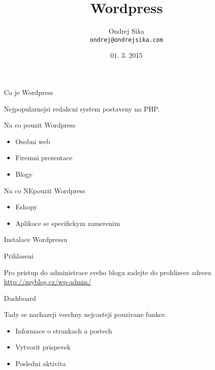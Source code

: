 \documentclass{beamer}
\title
    [Wordpress]
    {Wordpress}
\author
    [Ondrej Sika]
    {Ondrej Sika\\\texttt{ondrej@ondrejsika.com}}
\institute
    [Czechitas]
    {Czechitas\\\url{www.czechitas.cz}}
\date
    {01. 3. 2015}
\begin{document}
\maketitle

\begin{frame}
    {Co je Wordpress}

    Nejpopularnejsi redakcni system postaveny na PHP.
\end{frame}


\begin{frame}
    {Na co pouzit Wordpress}

    \begin{itemize}
        \item Osobni web
        \item Firemni prezentace
        \item Blogy
    \end{itemize}
\end{frame}


\begin{frame}
    {Na co NEpouzit Wordpress}

    \begin{itemize}
        \item Eshopy
        \item Aplikace se specifickym zamerenim
    \end{itemize}
\end{frame}


\begin{frame}
    {Instalace Wordpressu}

\end{frame}


\begin{frame}
    {Prihlaseni}

    Pro pristup do administrace sveho blogu zadejte do prohlizece adresu \url{http://myblog.cz/wp-admin/}
\end{frame}

\begin{frame}
    {Dashboard}

    Tady se nachazeji vsechny nejcasteji pouzivane funkce.

    \begin{itemize}
        \item Informace o strankach a postech
        \item Vytvorit prispevek
        \item Posledni aktivita
    \end{itemize}
\end{frame}
\end{document}
